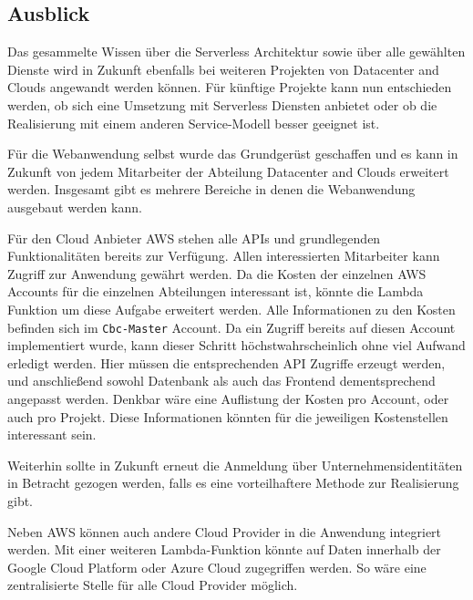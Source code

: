 \subsection{Ausblick}
Das gesammelte Wissen über die Serverless Architektur sowie über alle gewählten Dienste wird in Zukunft ebenfalls bei weiteren Projekten von Datacenter and Clouds angewandt werden können.
Für künftige Projekte kann nun entschieden werden, ob sich eine Umsetzung mit Serverless Diensten anbietet oder ob die Realisierung mit einem anderen Service-Modell besser geeignet ist.

Für die Webanwendung selbst wurde das Grundgerüst geschaffen und es kann in Zukunft von jedem Mitarbeiter der Abteilung Datacenter and Clouds erweitert werden.
Insgesamt gibt es mehrere Bereiche in denen die Webanwendung ausgebaut werden kann.

Für den Cloud Anbieter AWS stehen alle APIs und grundlegenden Funktionalitäten bereits zur Verfügung.
Allen interessierten Mitarbeiter kann Zugriff zur Anwendung gewährt werden.
Da die Kosten der einzelnen AWS Accounts für die einzelnen Abteilungen interessant ist, könnte die Lambda Funktion um diese Aufgabe erweitert werden.
Alle Informationen zu den Kosten befinden sich im \verb+Cbc-Master+ Account.
Da ein Zugriff bereits auf diesen Account implementiert wurde, kann dieser Schritt höchstwahrscheinlich ohne viel Aufwand erledigt werden.
Hier müssen die entsprechenden API Zugriffe erzeugt werden, und anschließend sowohl Datenbank als auch das Frontend dementsprechend angepasst werden.
Denkbar wäre eine Auflistung der Kosten pro Account, oder auch pro Projekt.
Diese Informationen könnten für die jeweiligen Kostenstellen interessant sein.

Weiterhin sollte in Zukunft erneut die Anmeldung über Unternehmensidentitäten in Betracht gezogen werden, falls es eine vorteilhaftere Methode zur Realisierung gibt.

Neben AWS können auch andere Cloud Provider in die Anwendung integriert werden.
Mit einer weiteren Lambda-Funktion könnte auf Daten innerhalb der Google Cloud Platform oder Azure Cloud zugegriffen werden.
So wäre eine zentralisierte Stelle für alle Cloud Provider möglich.















